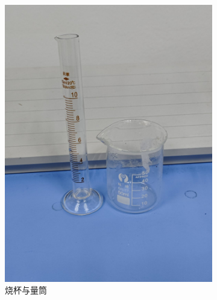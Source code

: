 \documentclass[a4paper]{report} %
\begin{document}
\begin{figure}[H]
\begin{subfigure}{0.22\textwidth}
        \includegraphics[width=\linewidth]{烧杯与量筒.jpg}
        \caption{烧杯与量筒}
    \end{subfigure}
    \begin{subfigure}{0.22\textwidth}

\end{subfigure}
\end{figure}
\end{document}
